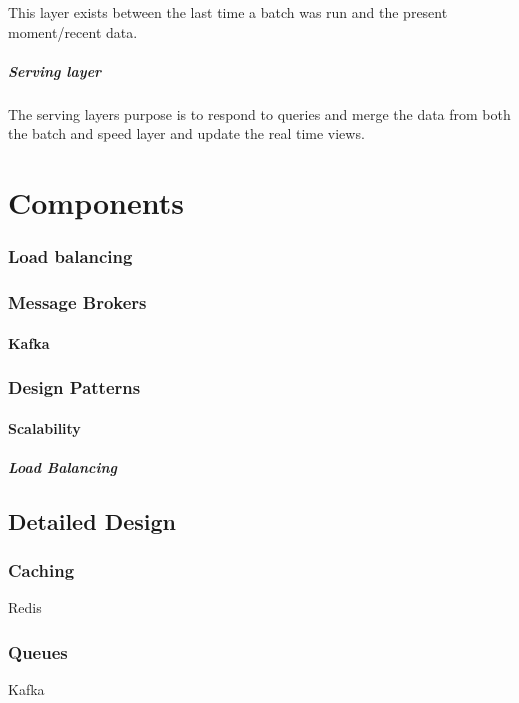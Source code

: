 \documentclass[a4paper, 11pt]{book}
\begin{document}
    This layer exists between the last time a batch was run and the present moment/recent data.

    \paragraph{Serving layer}
    The serving layers purpose is to respond to queries and merge the data from both the batch and speed layer and update the real time views.


    \chapter{Components}

    \subsection{Load balancing}

    \subsection{Message Brokers}

    \subsubsection{Kafka}

    \subsection{Design Patterns}

    \subsubsection{Scalability}

    \paragraph{Load Balancing}


    \section{Detailed Design}

    \subsection{Caching}
    Redis

    \subsection{Queues}
    Kafka
\end{document}
